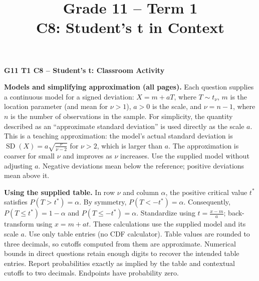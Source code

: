 \makeatletter
{}
\makeatother

\title{Grade 11 -- Term 1 \\ C8: Student's t in Context}
\author{}\date{}
\pagestyle{empty}
\linespread{1.05}
\setlength{\parskip}{3pt}
\setlength{\columnsep}{7mm}
\AtBeginDocument{\setlength{\abovedisplayskip}{4pt}\setlength{\belowdisplayskip}{4pt}}

	\begin{center}{\large\bfseries G11 T1 C8 -- Student's t: Classroom Activity}\end{center}
	\textbf{Models and simplifying approximation (all pages).} Each question supplies a continuous model for a signed deviation: $X=m+aT$, where $T\sim t_\nu$, $m$ is the location parameter (and mean for $\nu>1$), $a>0$ is the scale, and $\boxed{\nu=n-1}$, where $n$ is the number of observations in the sample. For simplicity, the quantity described as an ``approximate standard deviation'' is used directly as the scale $a$. This is a teaching approximation: the model's actual standard deviation is $\operatorname{SD}(X)=a\sqrt{\frac{\nu}{\nu-2}}$ for $\nu>2$, which is larger than $a$. The approximation is coarser for small $\nu$ and improves as $\nu$ increases. Use the supplied model without adjusting $a$. Negative deviations mean below the reference; positive deviations mean above it.
	
	\textbf{Using the supplied table.} In row $\nu$ and column $\alpha$, the positive critical value $t^*$ satisfies $P(T>t^*)=\alpha$. By symmetry, $P(T<-t^*)=\alpha$. Consequently, $P(T\le t^*)=1-\alpha$ and $P(T\le -t^*)=\alpha$. Standardize using $t=\frac{x-m}{a}$; back-transform using $x=m+at$. These calculations use the supplied model and its scale $a$. Use only table entries (no CDF calculator). Table values are rounded to three decimals, so cutoffs computed from them are approximate. Numerical bounds in direct questions retain enough digits to recover the intended table entries. Report probabilities exactly as implied by the table and contextual cutoffs to two decimals. Endpoints have probability zero.
	
